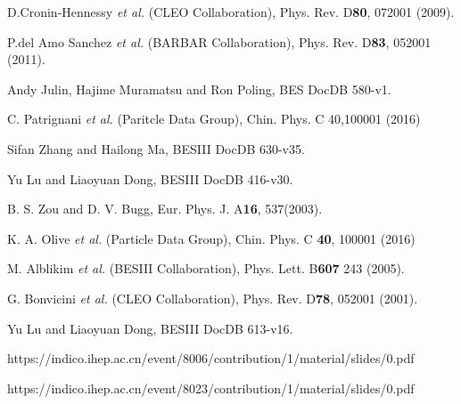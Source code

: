 \newpage
\begin{thebibliography}{99}

D.Cronin-Hennessy {\it et al.}  (CLEO Collaboration),
Phys. Rev. D\textbf{80}, 072001 (2009).

P.del Amo Sanchez {\it et al.}  (BARBAR Collaboration),
Phys. Rev. D\textbf{83}, 052001 (2011).

Andy Julin, Hajime Muramatsu and Ron Poling,  
BES\uppercase\expandafter{} DocDB 580-v1.

C. Patrignani {\it et al.}  (Paritcle Data Group),
Chin. Phys. C 40,100001 (2016)

Sifan Zhang and Hailong Ma, 
BESIII DocDB 630-v35.

Yu Lu and Liaoyuan Dong, 
BESIII DocDB 416-v30.

B. S. Zou and D. V. Bugg, 
Eur. Phys. J. A\textbf{16}, 537(2003).

K. A. Olive {\it et al.} (Particle Data Group), 
Chin. Phys. C \textbf{40}, 100001 (2016)

M. Alblikim {\it et al.}  (BESIII Collaboration),
Phys. Lett. B\textbf{607} 243 (2005).

G. Bonvicini {\it et al.}  (CLEO Collaboration),
Phys. Rev. D\textbf{78}, 052001 (2001).

Yu Lu and Liaoyuan Dong, 
BESIII DocDB 613-v16.

https://indico.ihep.ac.cn/event/8006/contribution/1/material/slides/0.pdf

https://indico.ihep.ac.cn/event/8023/contribution/1/material/slides/0.pdf

\end{thebibliography}

